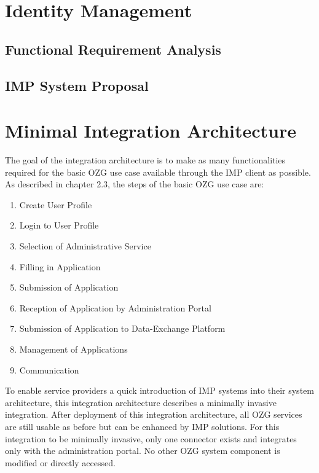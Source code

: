 \documentclass[
     12pt,         %
     a4paper,      %
     BCOR=10mm,version=first,     %
     DIV=14,version=first,        %
     ]{scrreprt}
\begin{document}
\chapter{Identity Management}

\section{Functional Requirement Analysis}



\section{IMP System Proposal}



\chapter{Minimal Integration Architecture}

The goal of the integration architecture is to make as many functionalities required for the basic OZG use case available through the IMP client as possible. As described in chapter 2.3, the steps of the basic OZG use case are:
\begin{enumerate}
    \item{Create User Profile}
    \item{Login to User Profile}
    \item{Selection of Administrative Service}
    \item{Filling in Application}
    \item{Submission of Application}
    \item{Reception of Application by Administration Portal}
    \item{Submission of Application to Data-Exchange Platform}
    \item{Management of Applications}
    \item{Communication}
\end{enumerate}

To enable service providers a quick introduction of IMP systems into their system architecture, this integration architecture describes a minimally invasive integration. After deployment of this integration architecture, all OZG services are still usable as before but can be enhanced by IMP solutions. For this integration to be minimally invasive, only one connector exists and integrates only with the administration portal. No other OZG system component is modified or directly accessed.
\end{document}
